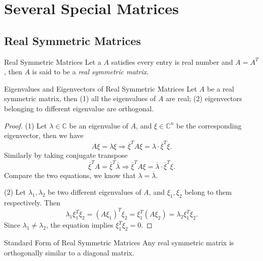 \section{Several Special Matrices}

\subsection{Real Symmetric Matrices}

\begin{definition}{Real Symmetric Matrices}{}
  Let a $A$ satisfies every entry is real number and $A = A^T$,
  then $A$ is said to be a \emph{real symmetric matrix}.
\end{definition}

\begin{proposition}{Eigenvalues and Eigenvectors of Real Symmetric Matrices}{}
  Let $A$ be a real symmetric matrix, then
  (1) all the eigenvalues of $A$ are real;
  (2) eigenvectors belonging to different eigenvalue are orthogonal.
\end{proposition}

\begin{proof}
  (1) Let $\lambda \in \mathbb{C}$ be an eigenvalue of $A$,
  and $\xi \in \mathbb{C}^n$ be the corresponding eigenvector,
  then we have
  \begin{equation}
    A\xi = \lambda \xi \Rightarrow \overline{\xi}^T A\xi = \lambda \cdot \overline{\xi}^T\xi.
  \end{equation}
  Similarly by taking conjugate transpose
  \begin{equation}
    \overline{\xi}^T A = \overline{\xi}^T \overline{\lambda} \Rightarrow
    \overline{\xi}^T A \xi = \overline{\lambda}  \cdot \overline{\xi}^T \xi.
  \end{equation}
  Compare the two equations, we know that $\lambda = \overline{\lambda}$.

  (2) Let $\lambda_1, \lambda_2$ be two different eigenvalues of $A$,
  and $\xi_1, \xi_2$ belong to them respectively.
  Then
  \begin{equation}
    \lambda_1 \xi_1^T \xi_2 = (A\xi_1)^T\xi_2 = \xi_1^T (A\xi_2) = \lambda_2 \xi_1^T\xi_2.
  \end{equation}
  Since $\lambda_1 \neq \lambda_2$, the equation implies $\xi_1^T\xi_2 = 0$.
\end{proof}

\begin{proposition}{Standard Form of Real Symmetric Matrices}{}
  Any real symmetric matrix is orthogonally similar to a diagonal matrix.
\end{proposition}

